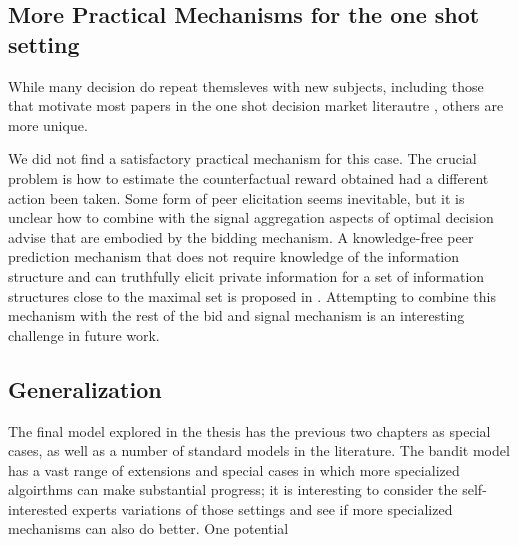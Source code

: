 

\subsection{More Practical Mechanisms for the one shot setting}
While many decision do repeat themsleves with new subjects, including those that motivate most papers in the one shot decision market literautre , others are more unique. 

We did not find a satisfactory practical mechanism for this case.
The crucial problem is how to estimate the counterfactual reward obtained had a different action been taken.
Some form of peer elicitation seems inevitable, but it is unclear how to combine with the signal aggregation aspects of optimal decision advise that are embodied by the bidding mechanism. 
A knowledge-free peer prediction mechanism that does not require knowledge of the information structure and
can truthfully elicit private information for a set of information structures close to the maximal set is proposed in \cite{zhang2014elicitability}. 
Attempting to combine this mechanism with the rest of the bid and signal mechanism is an interesting challenge in future work. 



\subsection{Generalization}

The final model explored in the thesis has the previous two chapters as special cases, as well as a number of standard models in the literature.
The bandit model has a vast range of extensions and special cases in which more specialized algoirthms can make substantial progress; it is interesting to consider the self-interested experts variations of those settings and see if more specialized mechanisms can also do better.
One potential 


